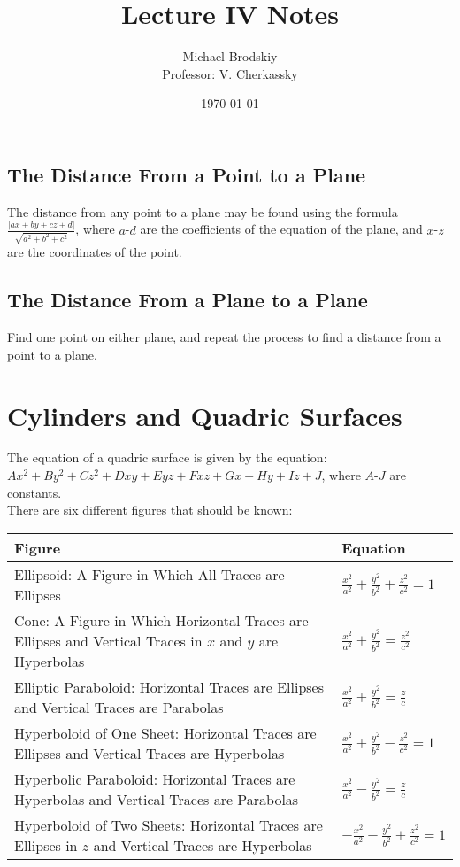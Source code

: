 \documentclass[12pt]{article}
\title{Lecture IV Notes}
\date{\today}
\author{Michael Brodskiy\\ \small Professor: V. Cherkassky}
\begin{document}
\maketitle

\subsection{The Distance From a Point to a Plane}

The distance from any point to a plane may be found using the formula $\frac{|ax+by+cz+d|}{\sqrt{a^2+b^2+c^2}}$, where $a$-$d$ are the coefficients of the equation of the plane, and $x$-$z$ are the coordinates of the point.

\subsection{The Distance From a Plane to a Plane}

Find one point on either plane, and repeat the process to find a distance from a point to a plane.

\section{Cylinders and Quadric Surfaces}

The equation of a quadric surface is given by the equation: $Ax^2+By^2+Cz^2+Dxy+Eyz+Fxz+Gx+Hy+Iz+J$, where $A$-$J$ are constants.\\

There are six different figures that should be known:

\begin{tabular}{|p{}||p{}|}

\hline
  Figure & Equation \\
\hline
Ellipsoid: A Figure in Which All Traces are Ellipses & $\frac{x^2}{a^2}+\frac{y^2}{b^2}+\frac{z^2}{c^2}=1$\\
\hline
  Cone: A Figure in Which Horizontal Traces are Ellipses and Vertical Traces in $x$ and $y$ are Hyperbolas & $\frac{x^2}{a^2}+\frac{y^2}{b^2}=\frac{z^2}{c^2}$\\
\hline
Elliptic Paraboloid: Horizontal Traces are Ellipses and Vertical Traces are Parabolas & $\frac{x^2}{a^2}+\frac{y^2}{b^2}=\frac{z}{c}$\\ 
\hline
Hyperboloid of One Sheet: Horizontal Traces are Ellipses and Vertical Traces are Hyperbolas & $\frac{x^2}{a^2}+\frac{y^2}{b^2}-\frac{z^2}{c^2}=1$\\ 
\hline
Hyperbolic Paraboloid: Horizontal Traces are Hyperbolas and Vertical Traces are Parabolas & $\frac{x^2}{a^2}-\frac{y^2}{b^2}=\frac{z}{c}$\\
\hline
Hyperboloid of Two Sheets: Horizontal Traces are Ellipses in $z$ and Vertical Traces are Hyperbolas & $-\frac{x^2}{a^2}-\frac{y^2}{b^2}+\frac{z^2}{c^2}=1$\\
\hline

\end{tabular}
\end{document}
